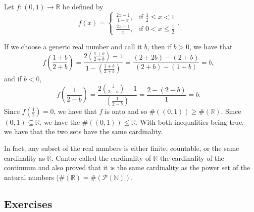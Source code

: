 \documentclass[
]{book}
\theoremstyle{definition}
\theoremstyle{definition}
\theoremstyle{definition}
\theoremstyle{remark}
\begin{document}
Let \(f:(0,1)\rightarrow \mathbb{R}\) be defined by
\[f(x)=\begin{cases}
    \frac{2x-1}{1-x}, & \mbox{if } \frac{1}{2} \leq x <1 \\
    \frac{2x-1}{x}, & \mbox{if } 0<x \leq \frac{1}{2}
    \end{cases}.\]

If we choose a generic real number and call it \(b\), then if \(b>0\), we have that
\[f\left( \frac{1+b}{2+b} \right) = \frac{2\left(\frac{1+b}{2+b}\right) -1}{1-\left(\frac{1+b}{2+b}\right)} = \frac{(2+2b)-(2+b)}{(2+b)-(1+b)} = b,\] and if \(b<0\),
\[f\left( \frac{1}{2-b}\right) = \frac{2\left(\frac{1}{2-b}\right) -1}{\left(\frac{1}{2-b}\right)} = \frac{2-(2-b)}{1} = b.\] Since \(f\left(\frac{1}{2}\right)=0\), we have that \(f\) is onto and so \(\# ((0,1)) \geq \# (\mathbb{R})\). Since \((0,1)\subseteq \mathbb{R}\), we have the \(\#((0,1)) \leq \mathbb{R}\). With both inequalities being true, we have that the two sets have the same cardinality.

In fact, any subset of the real numbers is either finite, countable, or the same cardinality as \(\mathbb{R}\). Cantor called the cardinality of \(\mathbb{R}\) the cardinality of the continuum and also proved that it is the same cardinality as the power set of the natural numbers (\(\#(\mathbb{R}) = \#(\mathcal{P}(\mathbb{N}))\).

\hypertarget{exercises-19}{%
\subsection{Exercises}\label{exercises-19}}
\end{document}
